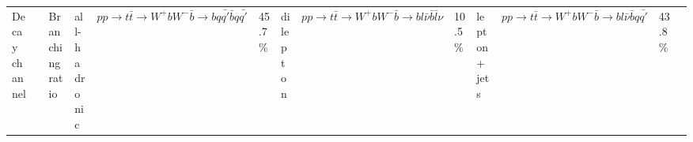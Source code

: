 \begin{center}
\label{tab:T22}

	
\vspace{0.3cm}	
	

\begin{tabular}{>{\centering}m{3.5cm}>{\centering}m{7.5cm} >{\centering}m{3.5cm} } \toprule

Decay channel& & Branching ratio&
\midrule
all-hadronic&$pp\rightarrow t\bar{t}\rightarrow W^+bW^-\bar{b}\rightarrow bq\bar{q'} \bar{b}q\bar{q'}$	&45.7\% &
dilepton	&$ pp\rightarrow t\bar{t}\rightarrow W^+bW^-\bar{b}\rightarrow bl\bar{\nu} \bar{b}\bar{l}\nu$&10.5\% &
lepton + jets		& $pp\rightarrow t\bar{t}\rightarrow W^+bW^-\bar{b}\rightarrow bl\bar{\nu} \bar{b}q\bar{q'}$&43.8\% &
\bottomrule
\end{tabular}

\end{center}